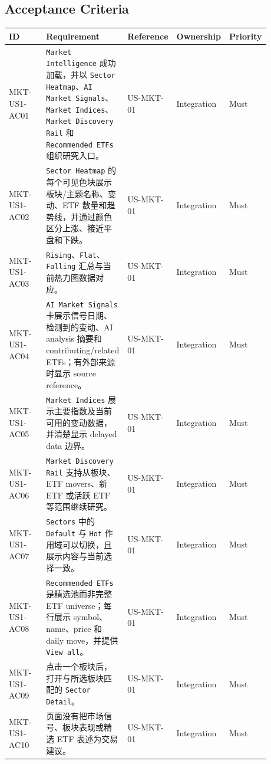 \subsection{Acceptance Criteria}
\begingroup
\small
\begin{longtable}{L{0.18\linewidth}L{0.30\linewidth}L{0.18\linewidth}L{0.12\linewidth}L{0.10\linewidth}}
\toprule
\textbf{ID} & \textbf{Requirement} & \textbf{Reference} & \textbf{Ownership} & \textbf{Priority} \\
\midrule
MKT-US1-AC01 & \texttt{Market Intelligence} 成功加载，并以 \texttt{Sector Heatmap}、\texttt{AI Market Signals}、\texttt{Market Indices}、\texttt{Market Discovery Rail} 和 \texttt{Recommended ETFs} 组织研究入口。 & US-MKT-01 & Integration & Must \\
MKT-US1-AC02 & \texttt{Sector Heatmap} 的每个可见色块展示板块/\allowbreak{}主题名称、变动、ETF 数量和趋势线，并通过颜色区分上涨、接近平盘和下跌。 & US-MKT-01 & Integration & Must \\
MKT-US1-AC03 & \texttt{Rising}、\texttt{Flat}、\texttt{Falling} 汇总与当前热力图数据对应。 & US-MKT-01 & Integration & Must \\
MKT-US1-AC04 & \texttt{AI Market Signals} 卡展示信号日期、检测到的变动、AI analysis 摘要和 contributing/\allowbreak{}related ETFs；有外部来源时显示 source reference。 & US-MKT-01 & Integration & Must \\
MKT-US1-AC05 & \texttt{Market Indices} 展示主要指数及当前可用的变动数据，并清楚显示 delayed data 边界。 & US-MKT-01 & Integration & Must \\
MKT-US1-AC06 & \texttt{Market Discovery Rail} 支持从板块、ETF movers、新 ETF 或活跃 ETF 等范围继续研究。 & US-MKT-01 & Integration & Must \\
MKT-US1-AC07 & \texttt{Sectors} 中的 \texttt{Default} 与 \texttt{Hot} 作用域可以切换，且展示内容与当前选择一致。 & US-MKT-01 & Integration & Must \\
MKT-US1-AC08 & \texttt{Recommended ETFs} 是精选池而非完整 ETF universe；每行展示 symbol、name、price 和 daily move，并提供 \texttt{View all}。 & US-MKT-01 & Integration & Must \\
MKT-US1-AC09 & 点击一个板块后，打开与所选板块匹配的 \texttt{Sector Detail}。 & US-MKT-01 & Integration & Must \\
MKT-US1-AC10 & 页面没有把市场信号、板块表现或精选 ETF 表述为交易建议。 & US-MKT-01 & Integration & Must \\
\bottomrule
\end{longtable}
\endgroup
\prdhr
\hypertarget{us-mkt-02}{}
